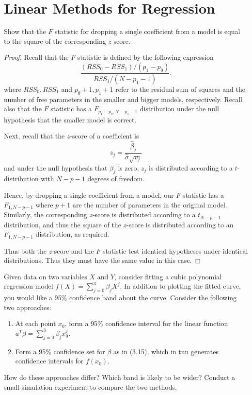 \chapter{Linear Methods for Regression}

\begin{exer}
  Show that the $F$ statistic for dropping a single coefficient from a model is equal to the square of the corresponding $z$-score.
\end{exer}

\begin{proof}
  Recall that the $F$ statistic is defined by the following expression \[
    \frac{(RSS_0 - RSS_1) / (p_1 - p_0)}{RSS_1 / (N - p_1 - 1)}.
  \] where $RSS_0, RSS_1$ and $p_0 + 1, p_1 + 1$ refer to the residual sum of squares and the number of free parameters in the smaller and bigger models, respectively.  Recall also that the $F$ statistic has a $F_{p_1 - p_0, N-p_1 - 1}$ distribution under the null hypothesis that the smaller model is correct.

  Next, recall that the $z$-score of a coefficient is \[
    z_j = \frac{\hat \beta_j}{\hat \sigma \sqrt{v_j}}
  \] and under the null hypothesis that $\beta_j$ is zero, $z_j$ is distributed according to a $t$-distribution with $N-p-1$ degrees of freedom. 

  Hence, by dropping a single coefficient from a model, our $F$ statistic has a $F_{1, N-p - 1}$ where $p + 1$ are the number of parameters in the original model.  Similarly, the corresponding $z$-score is distributed according to a $t_{N-p-1}$ distribution, and thus the square of the $z$-score is distributed according to an $F_{1, N-p-1}$ distribution, as required.

  Thus both the $z$-score and the $F$ statistic test identical hypotheses under identical distributions.  Thus they must have the same value in this case.    
\end{proof}

\begin{exer}
    Given data on two variables $X$ and $Y$, consider fitting a cubic polynomial regression model $f(X) = \sum_{j=0}^{3} \beta_j X^j$.  In addition to plotting the fitted curve, you would like a 95\% confidence band about the curve.  Consider the following two approaches:

\begin{enumerate}
    \item At each point $x_0$, form a 95\% confidence interval for the linear function $a^T \beta = \sum_{j=0}^{3}\beta_j x_0^j$.  
    \item Form a 95\% confidence set for $\beta$ as in (3.15), which in tun generates confidence intervals for $f(x_0)$.  
\end{enumerate}

   How do these approaches differ?  Which band is likely to be wider?  Conduct a small simulation experiment to compare the two methods.
\end{exer}

